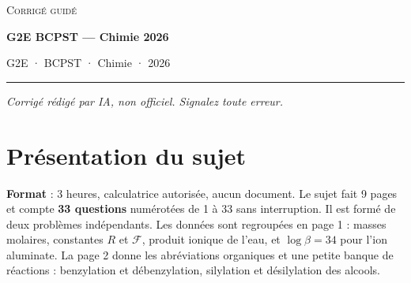\documentclass[11pt,a4paper]{article}
\begin{document}
\thispagestyle{plain}
\begin{center}
  {\small\scshape Corrigé guidé}\par\smallskip
  {\LARGE\bfseries G2E BCPST — Chimie 2026\par}\medskip
  {\large G2E · BCPST · Chimie · 2026\par}
\end{center}
\vspace{2pt}\hrule\vspace{8pt}

\emph{Corrigé rédigé par IA, non officiel. Signalez toute erreur.}

\hypertarget{pruxe9sentation-du-sujet}{%
\section{Présentation du sujet}\label{pruxe9sentation-du-sujet}}

\textbf{Format} : 3 heures, calculatrice autorisée, aucun document. Le sujet fait 9 pages et compte \textbf{33 questions} numérotées de 1 à 33 sans interruption. Il est formé de deux problèmes indépendants. Les données sont regroupées en page 1 : masses molaires, constantes \(R\) et \(\mathcal F\), produit ionique de l'eau, et \(\log\beta=34\) pour l'ion aluminate. La page 2 donne les abréviations organiques et une petite banque de réactions : benzylation et débenzylation, silylation et désilylation des alcools.
\end{document}
